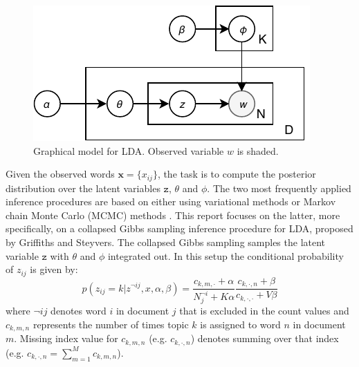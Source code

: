 \documentclass[journal]{IEEEtran}
\begin{document}
\begin{figure}
\centering
\includegraphics[scale=0.9]{plots/LDA.pdf}
\caption{Graphical model for LDA. Observed variable $w$ is shaded.}
\label{fig:lda}
\end{figure}

Given the observed words $\textbf{x}=\{x_{ij}\}$, the task is to compute the posterior distribution over the latent variables $\texttt{z}$, $\theta$ and $\phi$. The two most frequently applied inference procedures are based on either using variational methods\cite{blei2003latent} or Markov chain Monte Carlo (MCMC) methods \cite{griffiths2004finding}. This report focuses on the latter, more specifically, on a collapsed Gibbs sampling inference procedure for LDA, proposed by Griffiths and Steyvers\cite{griffiths2004finding}. The collapsed Gibbs sampling samples the latent variable $\texttt{z}$ with $\theta$ and $\phi$ integrated out. In this setup the conditional probability of $z_{ij}$ is given by:
$$
p(z_{ij}=k|z^{\lnot ij}, x, \alpha, \beta) = \dfrac{c_{k,m,\cdot} + \alpha}{N_{j}^{\lnot i}+K\alpha} \frac{c_{k,\cdot,n} + \beta}{c_{k,\cdot,\cdot} + V\beta}
$$ 
where $\lnot ij$ denotes word $i$ in document $j$ that is excluded in the count values and $c_{k,m,n}$ represents the number of times topic $k$ is assigned to word $n$ in document $m$. Missing index value for $c_{k,m,n}$ (e.g. $c_{k,\cdot,n}$) denotes summing over that index (e.g. $c_{k,\cdot,n} = \sum_{m=1}^{M} c_{k,m,n}$).
\end{document}
